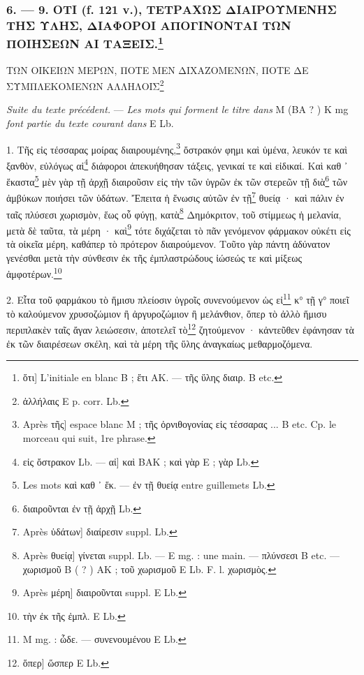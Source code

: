 \documentclass[a4paper, 11pt, oneside, polutonikogreek, french]{article}
\begin{document}
\bigskip
\centerline{\EightStarTaper}
\centerline{\EightStarTaper\EightStarTaper}
\bigskip

\subsubsection[6. --- 9. ΟΤΙ (f. 121 v.), ΤΕΤΡΑΧΩΣ ΔΙΑΙΡΟΥΜΕΝΗΣ ΤΗΣ ΥΛΗΣ, ΔΙΑΦΟΡΟΙ ΑΠΟΓΙΝΟΝΤΑΙ ΤΩΝ ΠΟΙΗΣΕΩΝ ΑΙ ΤΑΞΕΙΣ.]{6. --- 9. ΟΤΙ (f. 121 v.), ΤΕΤΡΑΧΩΣ ΔΙΑΙΡΟΥΜΕΝΗΣ ΤΗΣ ΥΛΗΣ, ΔΙΑΦΟΡΟΙ ΑΠΟΓΙΝΟΝΤΑΙ ΤΩΝ ΠΟΙΗΣΕΩΝ ΑΙ ΤΑΞΕΙΣ.\footnote{ὅτι] L'initiale en blanc B ; ἔτι AK. --- τῆς ὕλης διαιρ. B etc.}}

ΤΩΝ ΟΙΚΕΙΩΝ ΜΕΡΩΝ, ΠΟΤΕ ΜΕΝ ΔΙΧΑΖΟΜΕΝΩΝ, ΠΟΤΕ ΔΕ ΣΥΜΠΛΕΚΟΜΕΝΩΝ ΑΛΛΗΛΟΙΣ\footnote{ἀλλήλαις E p. corr. Lb.}

\emph{Suite du texte précédent.} --- \emph{Les mots qui forment le titre dans} M (BA ? ) K mg \emph{font partie du texte courant dans} E Lb.

1. Τῆς      εἰς τέσσαρας μοίρας διαιρουμένης,\footnote{Après τῆς] espace blanc M ; τῆς ὀρνιθογονίας εἰς τέσσαρας ... B etc. Cp. le morceau qui suit, 1re phrase.} ὄστρακόν φημι καὶ ὑμένα, λευκόν τε καὶ ξανθὸν, εὐλόγως αἱ\footnote{εἰς ὄστρακον Lb. --- αἰ] καὶ BAK ; καὶ γὰρ E ; γὰρ Lb.} διάφοροι ἀπεκυήθησαν τάξεις, γενικαί τε καὶ εἰδικαί. Καὶ καθ ᾽ ἕκαστα\footnote{Les mots καὶ καθ ᾽ ἕκ. --- ἐν τῇ θυείᾳ entre guillemets Lb.} μὲν γὰρ τῇ ἀρχῇ διαιροῦσιν εἰς τὴν τῶν ὑγρῶν ἐκ τῶν στερεῶν τῇ διὰ\footnote{διαιροῦνται ἐν τῇ ἀρχῇ Lb.} τῶν ἀμβύκων ποιήσει τῶν ὑδάτων. Ἔπειτα ἡ ἕνωσις αὐτῶν ἐν τῇ\footnote{Après ὑδάτων] διαίρεσιν suppl. Lb.} θυείᾳ · καὶ πάλιν ἐν ταῖς πλύσεσι χωρισμὸν, ἕως οὗ φύγῃ, κατὰ\footnote{Après θυείᾳ] γίνεται suppl. Lb. --- E mg. : une main. --- πλύνσεσι B etc. --- χωρισμοῦ B ( ? ) AK ; τοῦ χωρισμοῦ E Lb. F. l. χωρισμὸς.} Δημόκριτον, τοῦ στίμμεως ἡ μελανία, μετὰ δὲ ταῦτα, τὰ μέρη · καὶ\footnote{Après μέρη] διαιροῦνται suppl. E Lb.} τότε διχάζεται τὸ πᾶν γενόμενον φάρμακον οὐκέτι εἰς τὰ οἰκεῖα μέρη, καθάπερ τὸ πρότερον διαιρούμενον. Τοῦτο γὰρ πάντη ἀδύνατον γενέσθαι μετὰ τὴν σύνθεσιν ἐκ τῆς ἐμπλαστρώδους ἰώσεώς τε καὶ μίξεως ἀμφοτέρων.\footnote{τὴν ἐκ τῆς ἐμπλ. E Lb.}

2. Εἶτα τοῦ φαρμάκου τὸ ἥμισυ πλείοσιν ὑγροῖς συνενούμενον ὡς εἰ\footnote{M mg. : ὧδε. --- συνενουμένου E Lb.} κ° τῇ γ° ποιεῖ τὸ καλούμενον χρυσοζώμιον ἢ ἀργυροζώμιον ἢ μελάνθιον, ὅπερ τὸ ἀλλὸ ἥμισυ περιπλακὲν ταῖς ἄγαν λειώσεσιν, ἀποτελεῖ τὸ\footnote{ὅπερ] ὥσπερ E Lb.} ζητούμενον · κἀντεῦθεν ἐφάνησαν τὰ ἐκ τῶν διαιρέσεων σκέλη, καὶ τὰ μέρη τῆς ὕλης ἀναγκαίως μεθαρμοζόμενα.
\end{document}

